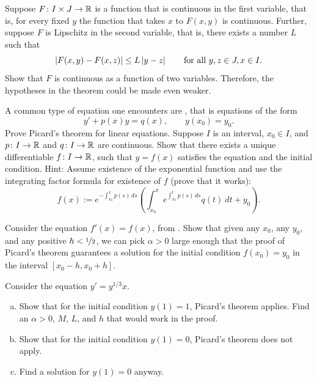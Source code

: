 \begin{exercise}
Suppose $F \colon I \times J \to {\mathbb{R}}$
is a function that is continuous in the first variable,
that is, for every fixed $y$ the function that takes $x$ to $F(x,y)$ is
continuous.  Further, suppose $F$ is Lipschitz in the second variable,
that is, there exists a number $L$ such that
\begin{equation*}
\left\lvert {F(x,y) - F(x,z)} \right\rvert \leq L \left\lvert {y-z} \right\rvert
\qquad \text{for all } y,z \in J, x \in I .
\end{equation*}
Show that $F$ is continuous as a function of two variables.  Therefore, the
hypotheses in the theorem could be made even weaker.
\end{exercise}

\begin{exercise}
A common type of equation one encounters are
\emph{}, that is
equations of the form
\begin{equation*}
y' + p(x) y = q(x) , \qquad y(x_0) = y_0 .
\end{equation*}
Prove Picard's theorem for linear equations.  Suppose $I$ is an
interval, $x_0 \in I$, and $p \colon I \to {\mathbb{R}}$ and $q \colon I \to {\mathbb{R}}$ are
continuous.
Show that there exists a unique differentiable $f \colon I \to {\mathbb{R}}$,
such that $y = f(x)$
satisfies the equation and the initial condition.
Hint: Assume existence of the exponential function and use the integrating
factor formula for existence of $f$ (prove that it works):
\begin{equation*}
f(x) := e^{-\int_{x_0}^x p(s)\, ds} \left( \int_{x_0}^x e^{\int_{x_0}^t p(s)\, ds}
q(t) ~dt + y_0 \right).
\end{equation*}
\end{exercise}

\begin{exercise}
Consider the equation $f'(x) = f(x)$,
from .  Show that given any $x_0$,
any $y_0$, and any positive $h < \nicefrac{1}{2}$, we can pick $\alpha >
0$ large enough that the proof of Picard's theorem guarantees a solution
for the initial condition $f(x_0) = y_0$ in the interval
$[x_0-h,x_0+h]$.
\end{exercise}

\begin{exercise}
Consider the equation $y' = y^{1/3}x$.
\begin{enumerate}[a)]
\item
Show that for the initial condition $y(1)=1$, Picard's theorem applies.
Find an $\alpha > 0$, $M$, $L$, and $h$ that would work in the proof.
\item
Show that for the initial condition $y(1) = 0$, Picard's theorem
does not apply.
\item
Find a solution for $y(1) = 0$ anyway.
\end{enumerate}
\end{exercise}

